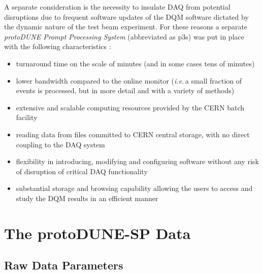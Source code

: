 \documentclass{webofc}
\newcommand{\pd}{protoDUNE\xspace}
\begin{document}
A separate consideration is the necessity to insulate DAQ from
potential disruptions due to frequent software updates of the DQM software dictated by
the dynamic nature of the test beam experiment. 
For these reasons a separate \textit{\pd Prompt Processing System} (abbreviated as p3s) was put
in place  with the following characteristics \cite{eps}:
\begin{itemize} 

\item turnaround time on the scale of minutes (and in some cases tens of minutes)

\item lower bandwidth compared to the online monitor (\textit{i.e.}\,a small fraction of events is processed,
but in more detail and with a variety of methods)

\item extensive and scalable computing resources provided by the CERN batch facility

\item reading data from files committed to CERN central storage, with no direct coupling to the DAQ system

\item flexibility in introducing, modifying and configuring software without any risk of disruption of
critical DAQ functionality

\item substantial storage and browsing capability allowing the users to access and study
the DQM results in an efficient manner

\end{itemize}


\section{The protoDUNE-SP Data}
\subsection{Raw Data Parameters}
\label{sec:np04_data_rate}
\end{document}
